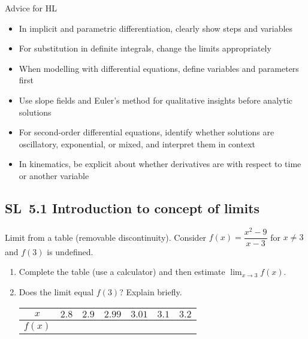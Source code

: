 \documentclass[11pt]{article}
\def\textbf#1{#1}%
\newcommand{\tocsubsection}[1]{\subsection{#1}}
\newcounter{question}
\begin{document}
\textbf{Advice for HL}  
\begin{itemize}
  \item In implicit and parametric differentiation, clearly show steps and variables
  \item For substitution in definite integrals, change the limits appropriately
  \item When modelling with differential equations, define variables and parameters first
  \item Use slope fields and Euler’s method for qualitative insights before analytic solutions
  \item For second-order differential equations, identify whether solutions are oscillatory, exponential, or mixed, and interpret them in context
  \item In kinematics, be explicit about whether derivatives are with respect to time or another variable
\end{itemize}


\tocsubsection{SL 5.1 \; Introduction to concept of limits}


\begin{question}
\textbf{Limit from a table (removable discontinuity).}
Consider $f(x)=\dfrac{x^{2}-9}{x-3}$ for $x\ne 3$ and $f(3)$ is undefined.
\begin{enumerate}
  \item Complete the table (use a calculator) and then estimate $\displaystyle\lim_{x\to 3} f(x)$.
  \item Does the limit equal $f(3)$? Explain briefly.

\begin{center}
\begin{tabular}{c|cccccc}
$x$ & $2.8$ & $2.9$ & $2.99$ & $3.01$ & $3.1$ & $3.2$\\\hline
$f(x)$ & & & & & &
\end{tabular}
\end{center}
\end{enumerate}
\end{question}
\end{document}
